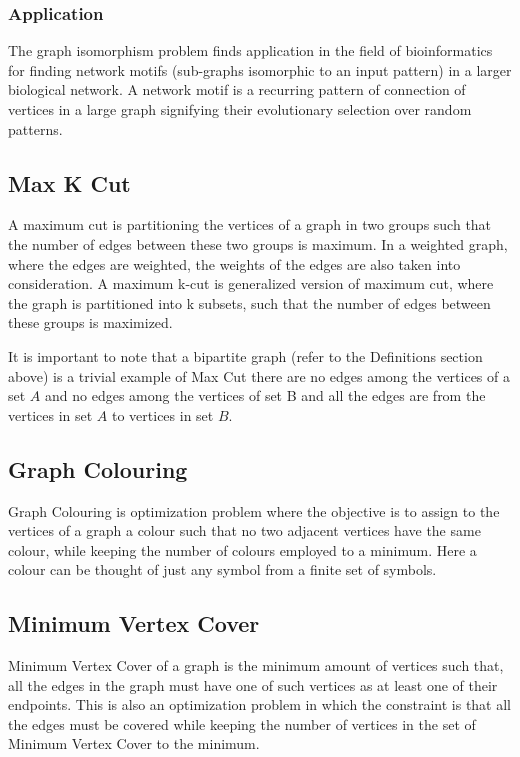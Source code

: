 \subsubsection{Application}
The graph isomorphism problem finds application in the field of bioinformatics
for finding network motifs (sub-graphs isomorphic to an input pattern) in a
larger biological network. A network motif is a recurring pattern of connection
of vertices in a large graph signifying their evolutionary selection over
random patterns. \cite{Bonnici2013}

\subsection{Max K Cut}
A maximum cut is partitioning the vertices of a graph in two groups such that
the number of edges between these two groups is maximum. In a weighted graph,
where the edges are weighted, the weights of the edges are also taken into
consideration.  A maximum k-cut is generalized version of maximum cut, where
the graph is partitioned into k subsets, such that the number of edges between
these groups is maximized.

It is important to note that a bipartite graph (refer to the Definitions
section above) is a trivial example of Max Cut there are no edges among the
vertices of a set $A$ and no edges among the vertices of set B and all the edges
are from the vertices in set $A$ to vertices in set $B$.

\subsection{Graph Colouring}
Graph Colouring is optimization problem where the objective is to assign to the vertices
of a graph a colour such that no two adjacent vertices have the same colour,
while keeping the number of colours employed to a minimum. Here a colour can be
thought of just any symbol from a finite set of symbols.

\subsection{Minimum Vertex Cover}
Minimum Vertex Cover of a graph is the minimum amount of vertices such that,
all the edges in the graph must have one of such vertices as at least one of
their endpoints. This is also an optimization problem in which the constraint is
that all the edges must be covered while keeping the number of vertices in the
set of Minimum Vertex Cover to the minimum.

